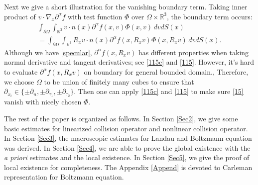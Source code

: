 \documentclass[reqno,a4paper]{amsart}
\numberwithin{equation}{section}
\newcommand{\1}{\mathbf{1}}
\newcommand{\R}{\mathbb{R}}
\newcommand{\pa}{\partial}
\newcommand{\na}{\nabla}
\newcommand{\<}{\langle}
\renewcommand{\>}{\rangle}
\begin{document}
Next we give a short illustration for the vanishing boundary term. 
Taking inner product of $v\cdot\na_x\pa^\alpha f$ with test function $\Phi$ over $\Omega\times\R^3$, the boundary term occurs:
\begin{multline}\label{15}
	\int_{\partial\Omega}\int_{\R^3}v\cdot n(x)\pa^\alpha f(x,v)\Phi(x,v)\,dvdS(x)\\
	= \int_{\partial\Omega}\int_{\R^3}R_xv\cdot n(x)\pa^\alpha f(x,R_xv)\Phi(x,R_xv)\,dvdS(x).
\end{multline}
Although we have \eqref{specular}, $\pa^\alpha f(x,R_xv)$ has different properties when taking normal derivative and tangent derivatives; see \eqref{115c} and \eqref{115}. However, it's hard to evaluate $\partial^\alpha f(x,R_xv)$ on boundary for general bounded domain., %
Therefore, we choose $\Omega$ to be union of finitely many cubes to ensure that $\partial_{x_i}\in\{\pm\partial_n,\pm\pa_{\tau_1},\pm\pa_{\tau_2}\}$. Then one can apply \eqref{115c} and \eqref{115} to make sure \eqref{15} vanish with nicely chosen $\Phi$. 
%





The rest of the paper is organized as follows. In Section \ref{Sec2}, we give some basic estimates for linearized collision operator and nonlinear collision operator. In Section \ref{Sec3}, the macroscopic estimates for Landau and Boltzmann equation was derived. In Section \ref{Sec4}, we are able to prove the global existence with the {\em a priori} estimates and the local existence. In Section \ref{Sec5}, we give the proof of local existence for completeness. The Appendix \ref{Append} is devoted to Carleman representation for Boltzmann equation. 
\end{document}
